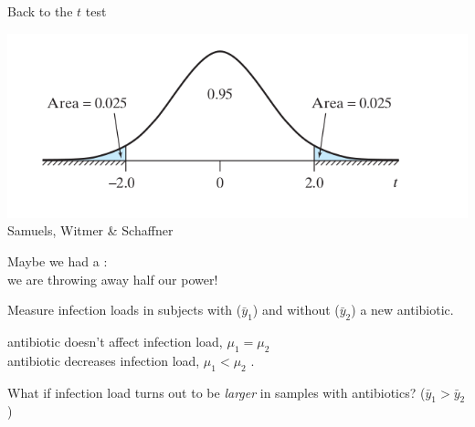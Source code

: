\begin{frame}{Back to the $t$ test}


    \begin{center}
        \includegraphics[width=.75\textwidth]{two-tailed-t}
        \flushright \tiny {Samuels, Witmer \& Schaffner}
    \end{center}
    
    Maybe we had a :\\
    we are throwing away half our power!

    \vspace{2em}

    Measure infection loads in subjects with ($\bar y_1$) and without ($\bar y_2$) a new antibiotic. 

    \vspace{1em}

     antibiotic doesn't affect infection load, $\mu_1 = \mu_2$ \\
     antibiotic decreases infection load, $\mu_1< \mu_2$ .

    \vspace{2em}
    \pause

    \alert{What if} infection load turns out to be \emph{larger} in samples with antibiotics? ($\bar y_1 > \bar y_2$)


\end{frame}

